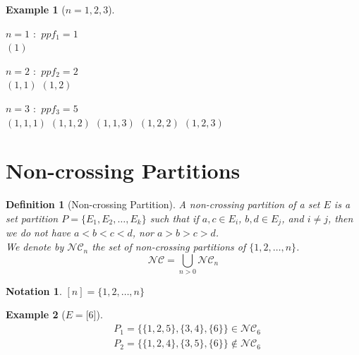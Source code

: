 \documentclass[12pt]{article}
\newtheorem{definition}{Definition}
\newtheorem*{example}{Example}
\newtheorem*{notation}{Notation}
\begin{document}
\begin{example}[$n = 1, 2, 3$]
    \text{}\\
    \begin{itemize*}
        \item $n = 1$ \text{ } $:$ \text{ } $ppf_1 = 1$\\
        \subitem $(1)$\\
        \item $n = 2$ \text{ } $:$ \text{ } $ppf_2 = 2$\\
        \subitem $(1, 1)$
        \subitem $(1, 2)$\\
        \item $n = 3$ \text{ } $:$ \text{ } $ppf_3 = 5$\\
        \subitem $(1, 1, 1)$
        \subitem $(1, 1, 2)$
        \subitem $(1, 1, 3)$
        \subitem $(1, 2, 2)$
        \subitem $(1, 2, 3)$\\
    \end{itemize*}
\end{example}

\section{Non-crossing Partitions}

\begin{definition}[Non-crossing Partition]
    A \emph{non-crossing partition} of a set $E$ is
    a set partition $P = \{E_1, E_2, \ldots, E_k\}$ such that
    if $a, c \in E_i$, $b, d \in E_j$, and $i \neq j$, then
    we do \emph{not} have $a < b < c < d$, nor $a > b > c > d$.\\
    We denote by $\mathcal{NC}_n$ the set of non-crossing partitions
    of $\{1, 2, \ldots, n\}$.
    $$\mathcal{NC} = \bigcup_{n > 0}{\mathcal{NC}_n}$$
\end{definition}

\begin{notation}
    $[n] = \{1, 2, \ldots, n\}$
\end{notation}

\begin{example}[$E = \lbrack 6 \rbrack $]
    \begin{align*}
        &P_1 = \{\{1, 2, 5\}, \{3, 4\}, \{6\}\} \in \mathcal{NC}_6\\
        &P_2 = \{\{1, 2, 4\}, \{3, 5\}, \{6\}\} \notin \mathcal{NC}_6
    \end{align*}
\end{example}
\end{document}

